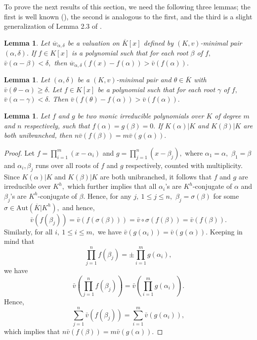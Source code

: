 \documentclass[11pt]{amsart}
\newtheorem{lemma}[theorem]{Lemma}
\theoremstyle{definition}
\theoremstyle{remark}
\numberwithin{equation}{section}
\begin{document}
	To prove the next results of this section, we need the following three lemmas; the first is well known (\cite[Lemma 2.1(ii)]{SK}), the second is analogous to the first, and the third is a slight generalization of Lemma 2.3 of \cite{AK2}.
	
	\begin{lemma}\label{dpl12}
		Let $\overline{w}_{\alpha,\delta}$ be a valuation on $\overline{K}[x]$ defined by $(K,v)$-minimal pair $(\alpha,\delta).$  If $f\in K[x]$ is a polynomial such that for each root $\beta$ of $f,$ $\bar{v}(\alpha-\beta)<\delta,$ then $\overline{w}_{\alpha,\delta}(f(x)-f(\alpha))>\bar{v}(f(\alpha)).$	
	\end{lemma}
	
	\begin{lemma}\label{3.12}
		Let $(\alpha,\delta)$ be a $(K,v)$-minimal pair and $\theta\in \overline{K}$ with $\bar{v}(\theta-\alpha)\geq\delta.$ Let $f\in K[x]$ be a polynomial such that for each root $\gamma$ of $f,$ $\bar{v}(\alpha-\gamma)<\delta.$ Then $\bar{v}(f(\theta)-f(\alpha))>\bar{v}(f(\alpha)).$
	\end{lemma}
	
	\begin{lemma}\label{3.13}
		Let $f$ and $g$ be two monic irreducible polynomials over $K$ of degree $m$ and $n$ respectively, such that $f(\alpha)=g(\beta)=0.$ If $K(\alpha)|K$ and $K(\beta)|K$ are both unibranched, then $n\bar{v}(f(\beta))=m\bar{v}(g(\alpha)).$
	\end{lemma}
	\begin{proof}
		Let $f=\prod_{i=1}^m(x-\alpha_i)$ and $g=\prod_{j=1}^n(x-\beta_j),$ where $\alpha_1=\alpha,$ $\beta_1=\beta$ and $\alpha_i, \beta_j$ runs over all roots of $f$ and $g$ respectively, counted with multiplicity. Since $K(\alpha)|K$ and $K(\beta)|K$ are both unibranched, it follows that $f$ and $g$ are irreducible over $K^h,$ which further implies that all $\alpha_i$'s are $K^h$-conjugate of $\alpha$ and $\beta_j$'s are $K^h$-conjugate of $\beta.$ Hence, for any $j,\ 1\leq j\leq n,$ $\beta_j=\sigma(\beta)$ for some $\sigma\in \text{Aut}(\overline{K}|K^h),$ and hence, \[\bar{v}(f(\beta_j))=\bar{v}(f(\sigma(\beta)))=\bar{v}\circ \sigma(f(\beta))=\bar{v}(f(\beta)).\] Similarly, for all $i,\ 1\leq i\leq m,$ we have $\bar{v}(g(\alpha_i))=\bar{v}(g(\alpha)).$	Keeping in mind that \[
			\prod_{j=1}^{n}f(\beta_j)=\pm	\prod_{i=1}^{m}g(\alpha_i),\]
			we have  \[\bar{v}(	\prod_{j=1}^{n}f(\beta_j))=\bar{v}(\prod_{i=1}^{m}g(\alpha_i)).\]
			Hence,\[ \sum_{j=1}^n\bar{v}(f(\beta_j))=\sum_{i=1}^m\bar{v}(g(\alpha_i)),\]
			which implies that $n\bar{v}(f(\beta))=m\bar{v}(g(\alpha)).$
		\end{proof}
	
\end{document}
